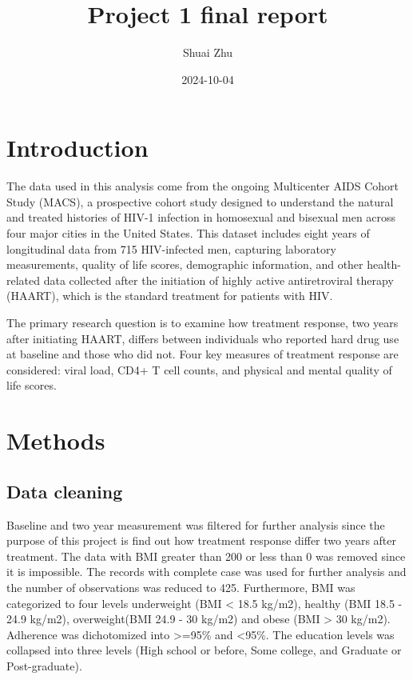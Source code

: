 \documentclass[
  12pt,
]{article}
\title{Project 1 final report}
\author{Shuai Zhu}
\date{2024-10-04}
\begin{document}
\maketitle

\hypertarget{introduction}{%
\section{Introduction}\label{introduction}}

The data used in this analysis come from the ongoing Multicenter AIDS
Cohort Study (MACS), a prospective cohort study designed to understand
the natural and treated histories of HIV-1 infection in homosexual and
bisexual men across four major cities in the United States. This dataset
includes eight years of longitudinal data from 715 HIV-infected men,
capturing laboratory measurements, quality of life scores, demographic
information, and other health-related data collected after the
initiation of highly active antiretroviral therapy (HAART), which is the
standard treatment for patients with HIV.

The primary research question is to examine how treatment response, two
years after initiating HAART, differs between individuals who reported
hard drug use at baseline and those who did not. Four key measures of
treatment response are considered: viral load, CD4+ T cell counts, and
physical and mental quality of life scores.

\hypertarget{methods}{%
\section{Methods}\label{methods}}

\hypertarget{data-cleaning}{%
\subsection{Data cleaning}\label{data-cleaning}}

Baseline and two year measurement was filtered for further analysis
since the purpose of this project is find out how treatment response
differ two years after treatment. The data with BMI greater than 200 or
less than 0 was removed since it is impossible. The records with
complete case was used for further analysis and the number of
observations was reduced to 425. Furthermore, BMI was categorized to
four levels underweight (BMI \textless{} 18.5 kg/m2), healthy (BMI 18.5
- 24.9 kg/m2), overweight(BMI 24.9 - 30 kg/m2) and obese (BMI
\textgreater{} 30 kg/m2). Adherence was dichotomized into
\textgreater=95\% and \textless95\%. The education levels was collapsed
into three levels (High school or before, Some college, and Graduate or
Post-graduate).
\end{document}
